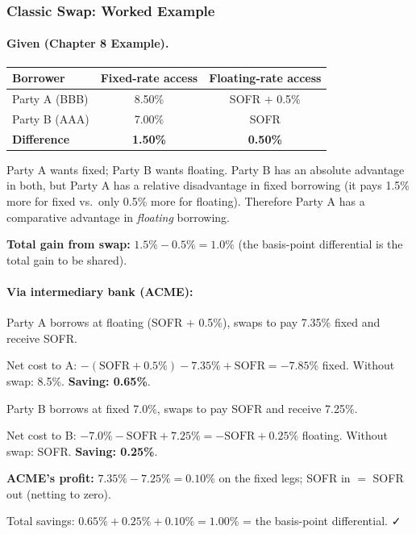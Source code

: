 \documentclass[11pt,a4paper]{article}
\begin{document}
\subsubsection{Classic Swap: Worked Example}

\paragraph{Given (Chapter 8 Example).}

\begin{center}
\begin{tabular}{lcc}
\toprule
Borrower & Fixed-rate access & Floating-rate access \\
\midrule
Party A (BBB) & 8.50\% & SOFR $+$ 0.5\% \\
Party B (AAA) & 7.00\% & SOFR \\
\textbf{Difference} & \textbf{1.50\%} & \textbf{0.50\%} \\
\bottomrule
\end{tabular}
\end{center}

Party A wants fixed; Party B wants floating. Party B has an absolute advantage in both, but Party A has a relative disadvantage in fixed borrowing (it pays 1.5\% more for fixed vs.\ only 0.5\% more for floating). Therefore Party A has a comparative advantage in \textit{floating} borrowing.

\textbf{Total gain from swap:} $1.5\% - 0.5\% = 1.0\%$ (the basis-point differential is the total gain to be shared).

\paragraph{Via intermediary bank (ACME):}

Party A borrows at floating (SOFR $+$ 0.5\%), swaps to pay 7.35\% fixed and receive SOFR.

Net cost to A: $-(\text{SOFR}+0.5\%) - 7.35\% + \text{SOFR} = -7.85\%$ fixed. Without swap: 8.5\%. \textbf{Saving: 0.65\%}.

Party B borrows at fixed 7.0\%, swaps to pay SOFR and receive 7.25\%.

Net cost to B: $-7.0\% - \text{SOFR} + 7.25\% = -\text{SOFR} + 0.25\%$ floating. Without swap: SOFR. \textbf{Saving: 0.25\%}.

\textbf{ACME's profit:} $7.35\% - 7.25\% = 0.10\%$ on the fixed legs; SOFR in $=$ SOFR out (netting to zero).

Total savings: $0.65\% + 0.25\% + 0.10\% = 1.00\%$ = the basis-point differential. ✓
\end{document}

